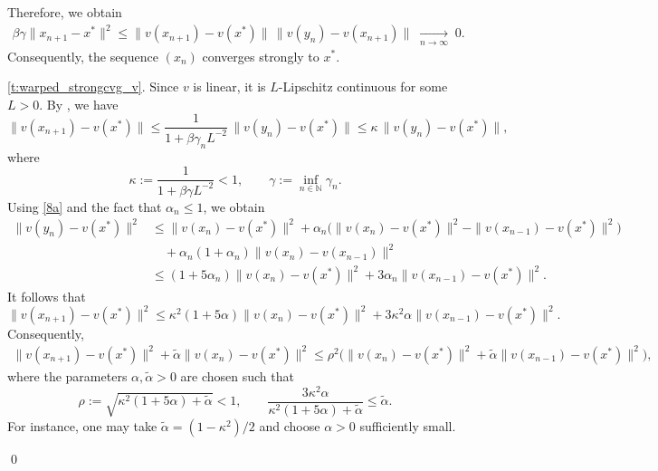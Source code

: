 \documentclass[11pt]{article}
\makeatletter
\renewenvironment{proof}[1][\proofname]{\par
	\normalfont
	\topsep0\p@\@plus3\p@ \trivlist
	\item[\hskip\labelsep\itshape
	#1\@addpunct{.}]\ignorespaces
}{%
	\qed\endtrivlist
}
\theoremstyle{definition}
\theoremstyle{definition}
\theoremstyle{definition}
\def\baqn{\begin{eqnarray*}}
\def\eaqn{\end{eqnarray*}}
\makeatother
\begin{document}
\begin{proof}
%
{
Therefore, we obtain
\begin{align*}
\beta\gamma \|x_{n+1}-x^*\|^2
\le \|v(x_{n+1})-v(x^*)\|\,\|v(y_n)-v(x_{n+1})\|
\;\xrightarrow[n\to\infty]{}\;0.
\end{align*}
Consequently, the sequence \((x_n)\) converges strongly to \(x^*\).
}
\medskip

\noindent\ref{t:warped_strongcvg_v}.  
{
Since \(v\) is linear, it is \(L\)-Lipschitz continuous for some \(L>0\).
By \cite[Proposition~3.3(ii)]{LDT}, we have
\[
\|v(x_{n+1})-v(x^*)\|
\le \frac{1}{1+\beta\gamma_n L^{-2}}\,\|v(y_n)-v(x^*)\|
\le \kappa\,\|v(y_n)-v(x^*)\|,
\]
where
\[
\kappa := \frac{1}{1+\beta\gamma L^{-2}} < 1,
\qquad
\gamma := \inf_{n\in\mathbb{N}}\gamma_n.
\]
}
{
Using \eqref{8a} and the fact that \(\alpha_n \le 1\), we obtain
\begin{align*}
\|v(y_n)-v(x^*)\|^2
&\le \|v(x_n)-v(x^*)\|^2
+ \alpha_n\bigl(\|v(x_n)-v(x^*)\|^2-\|v(x_{n-1})-v(x^*)\|^2\bigr) \\
&\quad + \alpha_n(1+\alpha_n)\|v(x_n)-v(x_{n-1})\|^2 \\
&\le (1+5\alpha_n)\|v(x_n)-v(x^*)\|^2
+ 3\alpha_n\|v(x_{n-1})-v(x^*)\|^2.
\end{align*}
It follows that
\[
\|v(x_{n+1})-v(x^*)\|^2
\le \kappa^2(1+5\alpha)\|v(x_n)-v(x^*)\|^2
+ 3\kappa^2\alpha\|v(x_{n-1})-v(x^*)\|^2.
\]
}
{
Consequently,
\begin{align*}
\|v(x_{n+1})-v(x^*)\|^2
+ \tilde{\alpha}\|v(x_n)-v(x^*)\|^2
\le \rho^2\bigl(\|v(x_n)-v(x^*)\|^2
+ \tilde{\alpha}\|v(x_{n-1})-v(x^*)\|^2\bigr),
\end{align*}
where the parameters \(\alpha,\tilde{\alpha}>0\) are chosen such that
\[
\rho := \sqrt{\kappa^2(1+5\alpha)+\tilde{\alpha}} < 1,
\qquad
\frac{3\kappa^2\alpha}{\kappa^2(1+5\alpha)+\tilde{\alpha}} \le \tilde{\alpha}.
\]
For instance, one may take \(\tilde{\alpha}=(1-\kappa^2)/2\) and choose
\(\alpha>0\) sufficiently small.
}


\end{proof}
\end{document}
